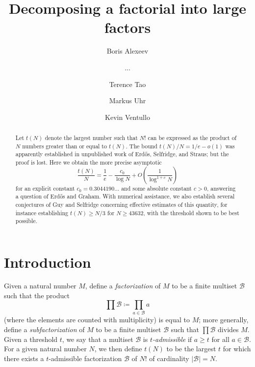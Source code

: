 \documentclass[12pt,a4paper,reqno]{amsart}
\numberwithin{equation}{section}
\theoremstyle{plain}
\theoremstyle{definition}
\newcommand\tuple{{\mathcal B}}
\begin{document}
\title{Decomposing a factorial into large factors}

\author{Boris Alexeev}
\address{???}


\author{...}
\address{???}

\author{Terence Tao}
\address{UCLA Department of Mathematics, Los Angeles, CA 90095-1555.}

\author{Markus Uhr}
\address{???}

\author{Kevin Ventullo}
\address{???}



\begin{abstract}  Let $t(N)$ denote the largest number such that $N!$ can be expressed as the product of $N$ numbers greater than or equal to $t(N)$.
The bound $t(N)/N = 1/e-o(1)$ was apparently established in unpublished work of Erd\H{o}s, Selfridge, and Straus; but the proof is lost.  Here we obtain the more precise asymptotic 
$$ \frac{t(N)}{N} = \frac{1}{e} - \frac{c_0}{\log N} + O\left( \frac{1}{\log^{1+c} N} \right)$$
for an explicit constant $c_0 = 0.3044190\dots$ and some absolute constant $c>0$, answering a question of Erd\H{o}s and Graham.  With numerical assistance, we also establish several conjectures of Guy and Selfridge concerning effective estimates of this quantity, for instance establishing $t(N) \geq N/3$ for $N \geq 43632$, with the threshold shown to be best possible. 
\end{abstract}


\maketitle


\section{Introduction}

Given a natural number $M$, define a \emph{factorization} of $M$ to be a finite multiset $\tuple$ such that the product
$$ \prod \tuple \coloneqq \prod_{a \in \tuple} a$$
(where the elements are counted with multiplicity) is equal to $M$; more generally, define a \emph{subfactorization} of $M$ to be a finite multiset $\tuple$ such that $\prod \tuple$ divides $M$.  Given a threshold $t$, we say that a multiset $\tuple$ is \emph{$t$-admissible} if $a \geq t$ for all $a \in \tuple$.  For a given natural number $N$, we then define $t(N)$ to be the largest $t$ for which there exists a $t$-admissible factorization $\tuple$ of $N!$ of cardinality $|\tuple|=N$.  
\end{document}
